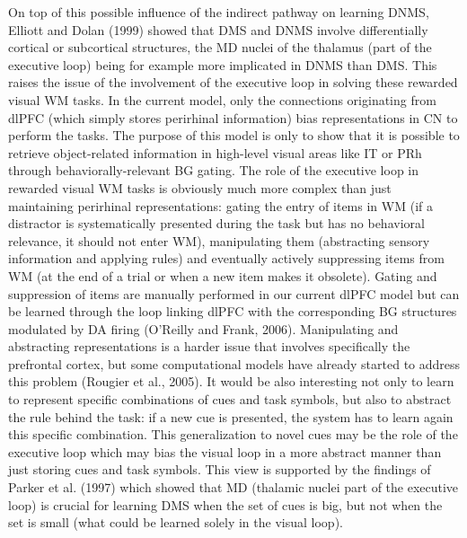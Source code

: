 \documentclass[
  11pt,
  a4paper,
]{scrbook}
\begin{document}
On top of this possible influence of the indirect pathway on learning
DNMS, Elliott and Dolan (1999) showed that DMS and DNMS involve
differentially cortical or subcortical structures, the MD nuclei of the
thalamus (part of the executive loop) being for example more implicated
in DNMS than DMS. This raises the issue of the involvement of the
executive loop in solving these rewarded visual WM tasks. In the current
model, only the connections originating from dlPFC (which simply stores
perirhinal information) bias representations in CN to perform the tasks.
The purpose of this model is only to show that it is possible to
retrieve object-related information in high-level visual areas like IT
or PRh through behaviorally-relevant BG gating. The role of the
executive loop in rewarded visual WM tasks is obviously much more
complex than just maintaining perirhinal representations: gating the
entry of items in WM (if a distractor is systematically presented during
the task but has no behavioral relevance, it should not enter WM),
manipulating them (abstracting sensory information and applying rules)
and eventually actively suppressing items from WM (at the end of a trial
or when a new item makes it obsolete). Gating and suppression of items
are manually performed in our current dlPFC model but can be learned
through the loop linking dlPFC with the corresponding BG structures
modulated by DA firing (O'Reilly and Frank, 2006). Manipulating and
abstracting representations is a harder issue that involves specifically
the prefrontal cortex, but some computational models have already
started to address this problem (Rougier et al., 2005). It would be also
interesting not only to learn to represent specific combinations of cues
and task symbols, but also to abstract the rule behind the task: if a
new cue is presented, the system has to learn again this specific
combination. This generalization to novel cues may be the role of the
executive loop which may bias the visual loop in a more abstract manner
than just storing cues and task symbols. This view is supported by the
findings of Parker et al. (1997) which showed that MD (thalamic nuclei
part of the executive loop) is crucial for learning DMS when the set of
cues is big, but not when the set is small (what could be learned solely
in the visual loop).
\end{document}
